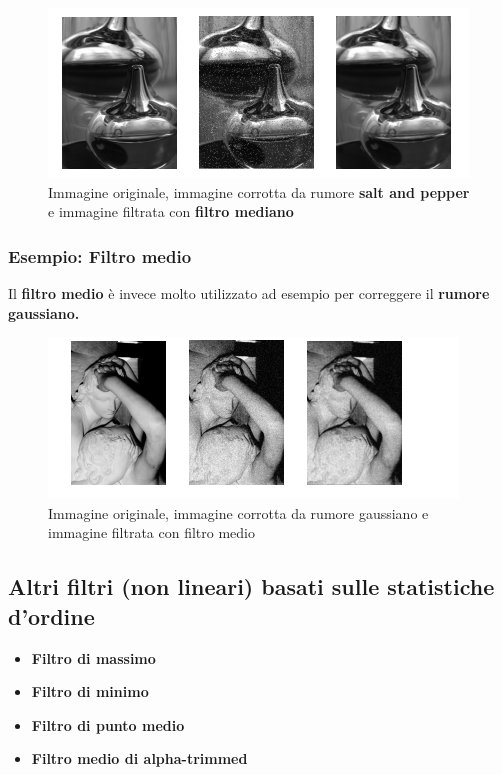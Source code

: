 \begin{figure}[H]
    \centering
    \includegraphics[width=\linewidth, keepaspectratio]{capitoli/immagini/imgs/esempio-filtro-mediano.png}
    \caption*{Immagine originale, immagine corrotta da rumore \textbf{salt and pepper} e immagine filtrata con \textbf{filtro mediano}}
\end{figure}

\newpage
\subsubsection{Esempio: Filtro medio}

Il \textbf{filtro medio} è invece molto utilizzato ad esempio per correggere il
\textbf{rumore gaussiano.}

\begin{figure}[H]
    \centering
    \includegraphics[width=\linewidth, keepaspectratio]{capitoli/immagini/imgs/filtro-medio-esempio2.png}
    \caption*{Immagine originale, immagine corrotta da rumore gaussiano e immagine filtrata con filtro medio}
\end{figure}


\subsection{Altri filtri (non lineari) basati sulle statistiche d'ordine}
\begin{itemize}
    \item \textbf{Filtro di massimo}
    \item \textbf{Filtro di minimo}
    \item \textbf{Filtro di punto medio}
    \item \textbf{Filtro medio di alpha-trimmed}
\end{itemize}

